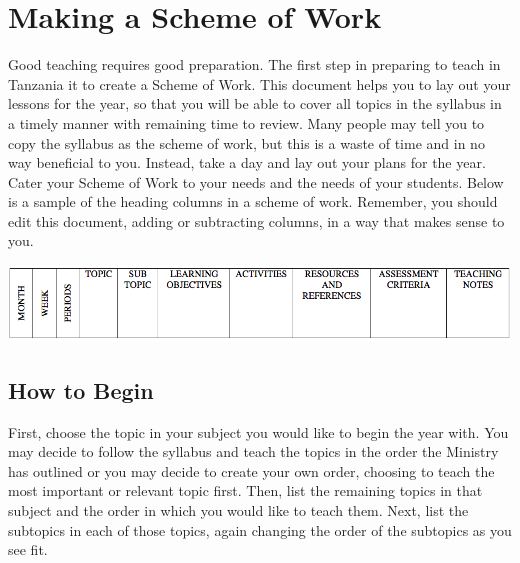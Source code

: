 \chapter{Making a Scheme of Work}
Good teaching requires good preparation.  The first step in preparing to teach in Tanzania it to create a Scheme of Work. This document helps you to lay out your lessons for the year, so that you will be able to cover all topics in the syllabus in a timely manner with remaining time to review.  Many people may tell you to copy the syllabus as the scheme of work, but this is a waste of time and in no way beneficial to you.  Instead, take a day and lay out your plans for the year.   Cater your Scheme of Work to your needs and the needs of your students. Below is a sample of the heading columns in a scheme of work. Remember, you should edit this document, adding or subtracting columns, in a way that makes sense to you.

\begin{flushleft}
\includegraphics[scale=.4]{./img/picture-1.png} 
\end{flushleft}


\section{How to Begin}
First, choose the topic in your subject you would like to begin the year with.  You may decide to follow the syllabus and teach the topics in the order the Ministry has outlined or you may decide to create your own order, choosing to teach the most important or relevant topic first.  Then, list the remaining topics in that subject and the order in which you would like to teach them.  Next, list the subtopics in each of those topics, again changing the order of the subtopics as you see fit.\\

